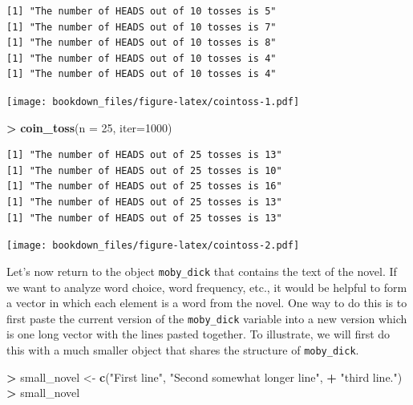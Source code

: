 \documentclass[
]{krantz}
\makeatletter
\newenvironment{Shaded}{\begin{snugshade}}{\end{snugshade}}
\newcommand{\DataTypeTok}[1]{\textcolor[rgb]{0.27,0.27,0.27}{#1}}
\newcommand{\DecValTok}[1]{\textcolor[rgb]{0.06,0.06,0.06}{#1}}
\newcommand{\KeywordTok}[1]{\textcolor[rgb]{0.27,0.27,0.27}{\textbf{#1}}}
\newcommand{\NormalTok}[1]{#1}
\newcommand{\OperatorTok}[1]{\textcolor[rgb]{0.43,0.43,0.43}{\textbf{#1}}}
\newcommand{\StringTok}[1]{\textcolor[rgb]{0.5,0.5,0.5}{#1}}
\newenvironment{kframe}{%
\medskip{}
\setlength{\fboxsep}{.8em}
 \def\at@end@of@kframe{}%
 \ifinner\ifhmode%
  \def\at@end@of@kframe{\end{minipage}}%
  \begin{minipage}{\columnwidth}%
 \fi\fi%
 \def\FrameCommand##1{\hskip\@totalleftmargin \hskip-\fboxsep
 \colorbox{shadecolor}{##1}\hskip-\fboxsep
     \hskip-\linewidth \hskip-\@totalleftmargin \hskip\columnwidth}%
 \MakeFramed {\advance\hsize-\width
   \@totalleftmargin\z@ \linewidth\hsize
   \@setminipage}}%
 {\par\unskip\endMakeFramed%
 \at@end@of@kframe}
\renewenvironment{Shaded}{\begin{kframe}}{\end{kframe}}
\makeatother
\begin{document}
\begin{verbatim}
[1] "The number of HEADS out of 10 tosses is 5"
[1] "The number of HEADS out of 10 tosses is 7"
[1] "The number of HEADS out of 10 tosses is 8"
[1] "The number of HEADS out of 10 tosses is 4"
[1] "The number of HEADS out of 10 tosses is 4"
\end{verbatim}

\texttt{[image: bookdown\_files/figure-latex/cointoss-1.pdf]}

\begin{Shaded}
\begin{Highlighting}[]
\OperatorTok{\textgreater{}}\StringTok{ }\KeywordTok{coin\_toss}\NormalTok{(}\DataTypeTok{n =} \DecValTok{25}\NormalTok{, }\DataTypeTok{iter=}\DecValTok{1000}\NormalTok{)}
\end{Highlighting}
\end{Shaded}

\begin{verbatim}
[1] "The number of HEADS out of 25 tosses is 13"
[1] "The number of HEADS out of 25 tosses is 10"
[1] "The number of HEADS out of 25 tosses is 16"
[1] "The number of HEADS out of 25 tosses is 13"
[1] "The number of HEADS out of 25 tosses is 13"
\end{verbatim}

\texttt{[image: bookdown\_files/figure-latex/cointoss-2.pdf]}

Let's now return to the object \texttt{moby\_dick} that contains the text of the novel. If we want to analyze word choice, word frequency, etc., it would be helpful to form a vector in which each element is a word from the novel. One way to do this is to first paste the current version of the \texttt{moby\_dick} variable into a new version which is one long vector with the lines pasted together. To illustrate, we will first do this with a much smaller object that shares the structure of \texttt{moby\_dick}.

\begin{Shaded}
\begin{Highlighting}[]
\OperatorTok{\textgreater{}}\StringTok{ }\NormalTok{small\_novel \textless{}{-}}\StringTok{ }\KeywordTok{c}\NormalTok{(}\StringTok{"First line"}\NormalTok{, }\StringTok{"Second somewhat longer line"}\NormalTok{, }
\OperatorTok{+}\StringTok{                  "third line."}\NormalTok{)}
\OperatorTok{\textgreater{}}\StringTok{ }\NormalTok{small\_novel}
\end{Highlighting}
\end{Shaded}
\end{document}
